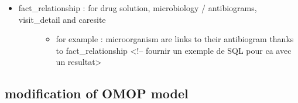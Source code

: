 \begin{itemize}
\item
  \begin{description}
  \item[fact\_relationship : for drug solution, microbiology /
  antibiograms, visit\_detail and caresite]
  \begin{itemize}
  \tightlist
  \item
    for example : microorganism are links to their antibiogram thanks to
    fact\_relationship \textless{}!-- fournir un exemple de SQL pour ca
    avec un resultat\textgreater{}
  \end{itemize}
  \end{description}
\end{itemize}

\subsection{modification of OMOP
model}\label{modification-of-omop-model}


